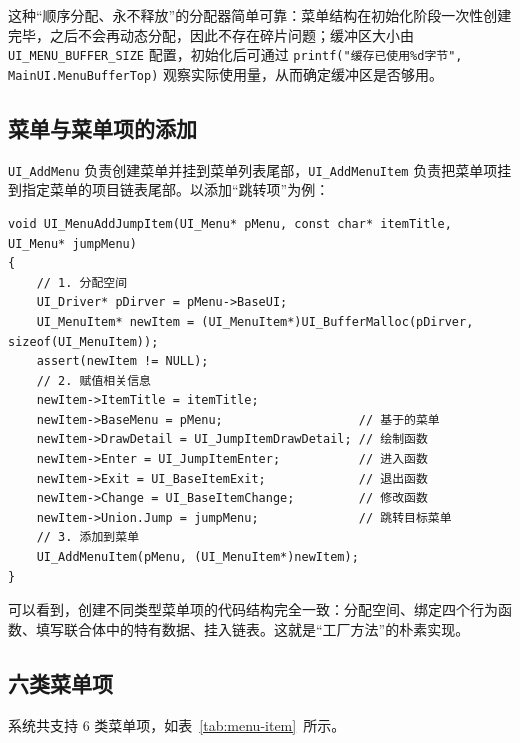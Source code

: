 这种“顺序分配、永不释放”的分配器简单可靠：菜单结构在初始化阶段一次性创建完毕，之后不会再动态分配，因此不存在碎片问题；缓冲区大小由 \texttt{UI\_MENU\_BUFFER\_SIZE} 配置，初始化后可通过 \texttt{printf("缓存已使用\%d字节", MainUI.MenuBufferTop)} 观察实际使用量，从而确定缓冲区是否够用。

\subsection{菜单与菜单项的添加}

\texttt{UI\_AddMenu} 负责创建菜单并挂到菜单列表尾部，\texttt{UI\_AddMenuItem} 负责把菜单项挂到指定菜单的项目链表尾部。以添加“跳转项”为例：

\begin{lstlisting}[style=c]
void UI_MenuAddJumpItem(UI_Menu* pMenu, const char* itemTitle, UI_Menu* jumpMenu)
{
    // 1. 分配空间
    UI_Driver* pDirver = pMenu->BaseUI;
    UI_MenuItem* newItem = (UI_MenuItem*)UI_BufferMalloc(pDirver, sizeof(UI_MenuItem));
    assert(newItem != NULL);
    // 2. 赋值相关信息
    newItem->ItemTitle = itemTitle;
    newItem->BaseMenu = pMenu;                   // 基于的菜单
    newItem->DrawDetail = UI_JumpItemDrawDetail; // 绘制函数
    newItem->Enter = UI_JumpItemEnter;           // 进入函数
    newItem->Exit = UI_BaseItemExit;             // 退出函数
    newItem->Change = UI_BaseItemChange;         // 修改函数
    newItem->Union.Jump = jumpMenu;              // 跳转目标菜单
    // 3. 添加到菜单
    UI_AddMenuItem(pMenu, (UI_MenuItem*)newItem);
}
\end{lstlisting}

可以看到，创建不同类型菜单项的代码结构完全一致：分配空间、绑定四个行为函数、填写联合体中的特有数据、挂入链表。这就是“工厂方法”的朴素实现。

\subsection{六类菜单项}

系统共支持 6 类菜单项，如表~\ref{tab:menu-item}~所示。

